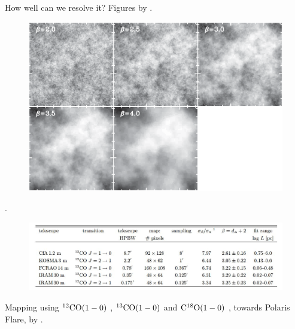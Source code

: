 \documentclass[12pt]{article}
\newcommand{\coaa}{$\rm^{12}CO(1-0)$ }
\newcommand{\cobb}{$\rm^{13}CO(1-0)$ }
\newcommand{\cocc}{$\rm C^{18}O(1-0)$ }
\begin{document}
        \clearpage
        \begin{small}
        How well can we resolve it? Figures by \cite{2001A&A...366..636B}.
        \end{small}
            \begin{figure}[hb]
              \centering
              \includegraphics[totalheight=80 mm]{img/2001Bensch.eps}
            \end{figure} 
                \clearpage
        \begin{small}
        \cite{2001A&A...366..636B}.
        \end{small}
            \begin{figure}[hb]
              \centering
              \includegraphics[totalheight=40 mm]{img/Bensch2001_table.JPG}
            \end{figure} 
        \clearpage
        \begin{small}
        Mapping using \coaa, \cobb and \cocc, towards Polaris Flare, by \cite{2001A&A...366..636B}.
        \end{small}
\end{document}
